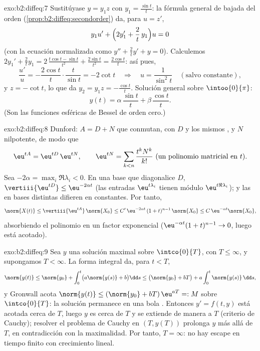 \begin{solution}{exo:b2:diffeq:7}
Sustitúyase $y = y_1 z$ con $y_1 = \frac{\sin t}{t}$: la fórmula
general de bajada del orden (\cref{prop:b2:diffeq:secondorder}) da,
para $u = z'$,
\[
y_1 u' + \Bigl(2y_1' + \frac{2}{t}\,y_1\Bigr)u = 0
\]
(con la ecuación normalizada como $y'' + \frac2t y' + y = 0$).
Calculemos $2y_1' + \frac2t y_1 = 2\,\frac{t\cos t - \sin t}{t^2} +
\frac{2\sin t}{t^2} = \frac{2\cos t}{t}$: así pues,
\[
\frac{u'}{u} = -\frac{2\cos t}{t}\cdot\frac{t}{\sin t}
= -2\cot t
\quad\Longrightarrow\quad
u = \frac{1}{\sin^2 t}
\quad (\text{salvo constante}),
\]
y $z = -\cot t$, lo que da $y_2 = y_1 z = -\frac{\cos t}{t}$.
Solución general sobre $\intoo{0}{\pi}$:
\[
y(t) = \alpha\,\frac{\sin t}{t} + \beta\,\frac{\cos t}{t} .
\]
(Son las funciones esféricas de Bessel de orden cero.)
\end{solution}

\begin{solution}{exo:b2:diffeq:8}
Dunford: $A = D + N$ que conmutan, con $D$  y los mismos
, y $N$ nilpotente, de modo que
\[
\eu^{tA} = \eu^{tD}\,\eu^{tN},
\qquad
\eu^{tN} = \sum_{k < n} \frac{t^kN^k}{k!}
\ \text{(un polinomio matricial en } t).
\]
Sea $-2\alpha = \max_i \Re\lambda_i < 0$. En una base que
diagonalice $D$, $\vertiii{\eu^{tD}} \leq \eu^{-2\alpha t}$ (las
entradas $\eu^{t\lambda_i}$ tienen módulo $\eu^{t\Re\lambda_i}$); y
las  en bases distintas difieren en constantes. Por tanto,
\[
\norm{X(t)} \leq \vertiii{\eu^{tA}}\,\norm{X_0}
\leq C'\,\eu^{-2\alpha t}\,(1 + t)^{n-1}\,\norm{X_0}
\leq C\,\eu^{-\alpha t}\norm{X_0} ,
\]
absorbiendo el polinomio en un factor exponencial ($\eu^{-\alpha
t}(1+t)^{n-1} \to 0$, luego está acotado).
\end{solution}

\begin{solution}{exo:b2:diffeq:9}
Sea $y$ una solución maximal sobre $\intco{0}{T}$, con $T \leq
\infty$, y supongamos $T < \infty$. La forma integral da, para $t <
T$,
\[
\norm{y(t)} \leq \norm{y_0} + \int_0^t \bigl(a\norm{y(s)} +
b\bigr)\dd s
\leq \bigl(\norm{y_0} + bT\bigr) + a\int_0^t\norm{y(s)}\,\dd s ,
\]
y Gronwall acota $\norm{y(t)} \leq (\norm{y_0} + bT)\,\eu^{aT} =: M$
sobre $\intco{0}{T}$: la solución permanece en una bola .
Entonces $y' = f(t, y)$ está acotada cerca de $T$, luego $y$ es
 cerca de $T$ y se extiende de manera  a $T$
(criterio de Cauchy); resolver el problema de Cauchy en $(T, y(T))$
prolonga $y$ más allá de $T$, en contradicción con la maximalidad.
Por tanto, $T = \infty$: no hay escape en tiempo finito con
crecimiento lineal.
\end{solution}

